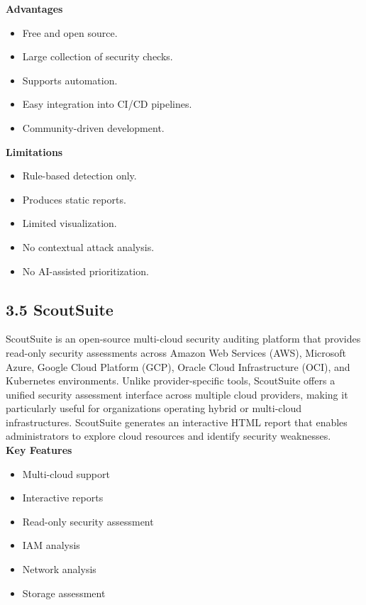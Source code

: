 \textbf{Advantages}

\begin{itemize}
\tightlist
\item
  Free and open source.\\
\item
  Large collection of security checks.\\
\item
  Supports automation.\\
\item
  Easy integration into CI/CD pipelines.\\
\item
  Community-driven development.
\end{itemize}

\textbf{Limitations}

\begin{itemize}
\tightlist
\item
  Rule-based detection only.\\
\item
  Produces static reports.\\
\item
  Limited visualization.\\
\item
  No contextual attack analysis.\\
\item
  No AI-assisted prioritization.
\end{itemize}

\subsection{3.5 ScoutSuite}

ScoutSuite is an open-source multi-cloud security auditing platform that provides read-only security assessments across Amazon Web Services (AWS), Microsoft Azure, Google Cloud Platform (GCP), Oracle Cloud Infrastructure (OCI), and Kubernetes environments. Unlike provider-specific tools, ScoutSuite offers a unified security assessment interface across multiple cloud providers, making it particularly useful for organizations operating hybrid or multi-cloud infrastructures. ScoutSuite generates an interactive HTML report that enables administrators to explore cloud resources and identify security weaknesses.\\
\textbf{Key Features}

\begin{itemize}
\tightlist
\item
  Multi-cloud support\\
\item
  Interactive reports\\
\item
  Read-only security assessment\\
\item
  IAM analysis\\
\item
  Network analysis\\
\item
  Storage assessment
\end{itemize}

